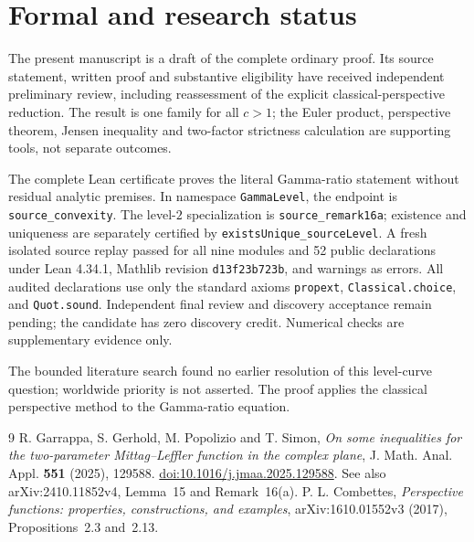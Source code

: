 \documentclass[11pt]{article}
\begin{document}
\section{Formal and research status}
The present manuscript is a draft of the complete ordinary proof.
Its source statement, written proof and substantive eligibility have received
independent preliminary review, including reassessment of the explicit
classical-perspective reduction. The result is one family for all $c>1$;
the Euler product, perspective theorem, Jensen inequality and two-factor
strictness calculation are supporting tools, not separate outcomes.

The complete Lean certificate proves the literal Gamma-ratio statement
without residual analytic premises. In namespace \texttt{GammaLevel},
the endpoint is \texttt{source\_convexity}.
The level-$2$ specialization is \texttt{source\_remark16a}; existence and
uniqueness are separately certified by \texttt{existsUnique\_sourceLevel}.
A fresh isolated source replay passed for all nine modules and 52 public
declarations under Lean 4.34.1, Mathlib revision
\texttt{d13f23b723b}, and warnings as errors.
All audited declarations use only the standard axioms \texttt{propext},
\texttt{Classical.choice}, and \texttt{Quot.sound}.
Independent final review and discovery acceptance remain pending; the
candidate has zero discovery credit. Numerical checks are supplementary
evidence only.

The bounded literature search found no earlier resolution of this level-curve
question; worldwide priority is not asserted. The proof applies the classical
perspective method to the Gamma-ratio equation.

\begin{thebibliography}{9}
 R. Garrappa, S. Gerhold, M. Popolizio and T. Simon,
\emph{On some inequalities for the two-parameter Mittag--Leffler function
in the complex plane}, J. Math. Anal. Appl. \textbf{551} (2025), 129588.
\href{https://doi.org/10.1016/j.jmaa.2025.129588}{doi:10.1016/j.jmaa.2025.129588}.
See also arXiv:2410.11852v4, Lemma~15 and Remark~16(a).
 P. L. Combettes,
\emph{Perspective functions: properties, constructions, and examples},
arXiv:1610.01552v3 (2017), Propositions~2.3 and~2.13.
\end{thebibliography}
\end{document}

